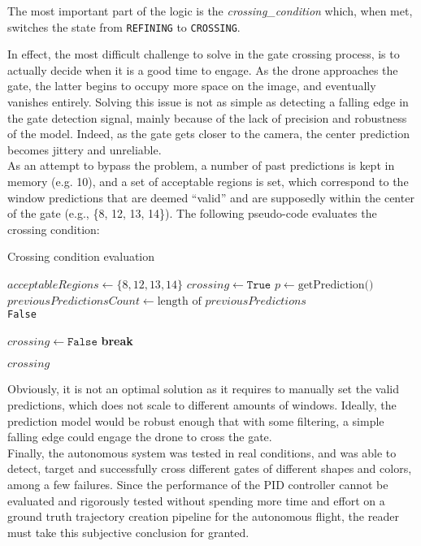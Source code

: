 The most important part of the logic is the \emph{crossing\_condition} which,
when met, switches the state from \texttt{REFINING} to \texttt{CROSSING}.

In effect, the most difficult challenge to solve in the gate crossing process,
is to actually decide when it is a good time to engage. As the drone
approaches the gate, the latter begins to occupy more space on the image, and
eventually vanishes entirely. Solving this issue is not as simple as detecting
a falling edge in the gate detection signal, mainly because of the lack of
precision and robustness of the model. Indeed, as the gate gets closer to the
camera, the center prediction becomes jittery and unreliable.\\

As an attempt to bypass the problem, a number of past predictions is kept in
memory (e.g. 10), and a set of acceptable regions is set, which correspond to
the window predictions that are deemed ``valid'' and are supposedly within the
center of the gate (e.g., \{8, 12, 13, 14\}). The following pseudo-code evaluates
the crossing condition:

\makeatletter
\def\BState{\State\hskip-\ALG@thistlm}
\makeatother

\begin{algorithm}
	\caption{Crossing condition evaluation}\label{alg:crosscond}
	\begin{algorithmic}[1]
			\State $\textit{acceptableRegions} \gets \{8, 12, 13, 14\}$
			\State $crossing \gets \texttt{True}$
			\State $p \gets \text{getPrediction()}$
			\State $previousPredictionsCount \gets \text{length of }
				\textit{previousPredictions}$
			~\\
				\Return \texttt{False}
			\EndIf

					\State $crossing \gets \texttt{False}$
					\State \textbf{break}
				\EndIf
			\EndFor

			\Return $\textit{crossing}$

		\EndProcedure
	\end{algorithmic}
\end{algorithm}

Obviously, it is not an optimal solution as it requires to manually set the
valid predictions, which does not scale to different amounts of windows.
Ideally, the prediction model would be robust enough that with some filtering,
a simple falling edge could engage the drone to cross the gate.\\

Finally, the autonomous system was tested in real conditions, and was
able to detect, target and successfully cross different gates of different
shapes and colors, among a few failures. Since the performance of the PID
controller cannot be evaluated and rigorously tested without spending more time
and effort on a ground truth trajectory creation pipeline for the autonomous
flight, the reader must take this subjective conclusion for granted.
